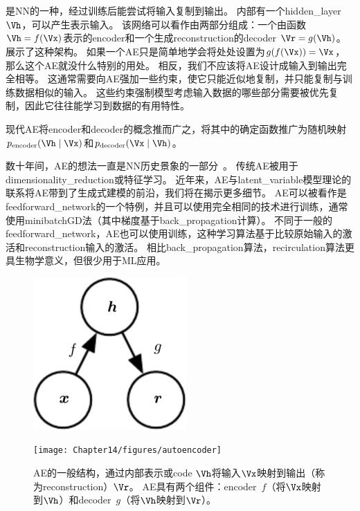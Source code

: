 \chapter{}
\label{chap:autoencoders}
是\gls{NN}的一种，经过训练后能尝试将输入复制到输出。
内部有一个\gls{hidden_layer} $\Vh$，可以产生表示输入。
该网络可以看作由两部分组成：一个由函数$ \Vh = f(\Vx)$表示的\gls{encoder}和一个生成\gls{reconstruction}的\gls{decoder} $\Vr=g(\Vh)$。
展示了这种架构。
如果一个\gls{AE}只是简单地学会将处处设置为$g(f(\Vx)) =\Vx$，那么这个\gls{AE}就没什么特别的用处。
相反，我们不应该将\gls{AE}设计成输入到输出完全相等。
这通常需要向\gls{AE}强加一些约束，使它只能近似地复制，并只能复制与训练数据相似的输入。
这些约束强制模型考虑输入数据的哪些部分需要被优先复制，因此它往往能学习到数据的有用特性。


现代\gls{AE}将\gls{encoder}和\gls{decoder}的概念推而广之，将其中的确定函数推广为随机映射$p_{\text{encoder}} (\Vh \mid \Vx)$和$p_{\text{decoder}}(\Vx \mid \Vh)$。


数十年间，\gls{AE}的想法一直是\gls{NN}历史景象的一部分~\citep{Lecun-these87,Bourlard88,hinton1994amd-small}。
传统\gls{AE}被用于\gls{dimensionality_reduction}或特征学习。
近年来，\gls{AE}与\gls{latent_variable}模型理论的联系将\gls{AE}带到了生成式建模的前沿，我们将在揭示更多细节。
\gls{AE}可以被看作是\gls{feedforward_network}的一个特例，并且可以使用完全相同的技术进行训练，通常使用\gls{minibatch}\gls{GD}法（其中梯度基于\gls{back_propagation}计算）。
不同于一般的\gls{feedforward_network}，\gls{AE}也可以使用训练\citep{Hinton+McClelland-NIPS1987}，这种学习算法基于比较原始输入的激活和\gls{reconstruction}输入的激活。
相比\gls{back_propagation}算法，\gls{recirculation}算法更具生物学意义，但很少用于\gls{ML}应用。

\begin{figure}[!htb]
\ifOpenSource
\centerline{\includegraphics[scale=0.5]{images/118.png}}
\else
\centerline{\texttt{[image: Chapter14/figures/autoencoder]}}
\fi
\caption{\gls{AE}的一般结构，通过内部表示或\gls{code} $\Vh$将输入$\Vx$映射到输出（称为\gls{reconstruction}）$\Vr$。
\gls{AE}具有两个组件：\gls{encoder}~$f$（将$\Vx$映射到$\Vh$）和\gls{decoder}~$g$（将$\Vh$映射到$\Vr$）。
}
\label{fig:chap14_autoencoder}
\end{figure}

